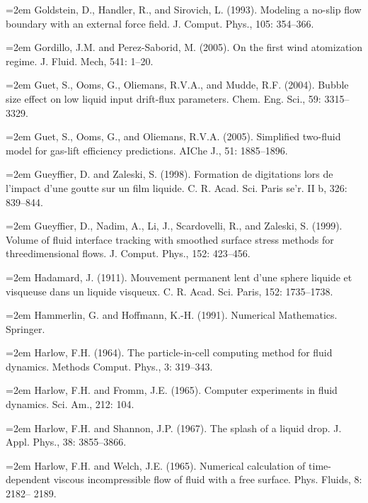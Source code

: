 \documentclass[11pt,a4paper,openany,fontset=none]{ctexbook}
\begin{document}
\par\hangindent=2em Goldstein, D., Handler, R., and Sirovich, L. (1993). Modeling a no-slip flow boundary with an external force field. J. Comput. Phys., 105: 354--366.

\par\hangindent=2em Gordillo, J.M. and Perez-Saborid, M. (2005). On the first wind atomization regime. J. Fluid. Mech, 541: 1--20.

\par\hangindent=2em Guet, S., Ooms, G., Oliemans, R.V.A., and Mudde, R.F. (2004). Bubble size effect on low liquid input drift-flux parameters. Chem. Eng. Sci., 59: 3315--3329.

\par\hangindent=2em Guet, S., Ooms, G., and Oliemans, R.V.A. (2005). Simplified two-fluid model for gas-lift efficiency predictions. AIChe J., 51: 1885--1896.

\par\hangindent=2em Gueyffier, D. and Zaleski, S. (1998). Formation de digitations lors de l’impact d’une goutte sur un film liquide. C. R. Acad. Sci. Paris se'r. II b, 326: 839--844.

\par\hangindent=2em Gueyffier, D., Nadim, A., Li, J., Scardovelli, R., and Zaleski, S. (1999). Volume of fluid interface tracking with smoothed surface stress methods for threedimensional flows. J. Comput. Phys., 152: 423--456.

\par\hangindent=2em Hadamard, J. (1911). Mouvement permanent lent d’une sphere liquide et visqueuse dans un liquide visqueux. C. R. Acad. Sci. Paris, 152: 1735--1738.

\par\hangindent=2em Hammerlin, G. and Hoffmann, K.-H. (1991). Numerical Mathematics. Springer.

\par\hangindent=2em Harlow, F.H. (1964). The particle-in-cell computing method for fluid dynamics. Methods Comput. Phys., 3: 319--343.

\par\hangindent=2em Harlow, F.H. and Fromm, J.E. (1965). Computer experiments in fluid dynamics. Sci. Am., 212: 104.

\par\hangindent=2em Harlow, F.H. and Shannon, J.P. (1967). The splash of a liquid drop. J. Appl. Phys., 38: 3855--3866.

\par\hangindent=2em Harlow, F.H. and Welch, J.E. (1965). Numerical calculation of time-dependent viscous incompressible flow of fluid with a free surface. Phys. Fluids, 8: 2182-- 2189.
\end{document}
